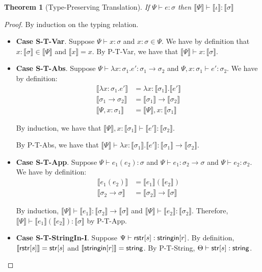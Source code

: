 \documentclass[11pt,leqno]{article}
\newtheorem{thm}{Theorem}
\theoremstyle{definition}
\newcommand{\stringin}[1]{{\sf stringin}[#1]}
\renewcommand{\tstr}[1]{{{\sf str}[#1]}}
\newcommand{\str}{{\sf string}}
\newcommand{\sctx}{\Psi} %
\newcommand{\tctx}{\Theta} %
\newcommand{\trden}[1]{\llbracket #1 \rrbracket} %
\begin{document}
\begin{thm}[Type-Preserving Translation]\label{thm:tpc}
If $\sctx \vdash e: \sigma$ then 
$\trden{\sctx} \vdash \trden{\iota} : \trden{\sigma}$
\end{thm}
\begin{proof}
By induction on the typing relation.

\begin{itemize}[label=$ $,itemsep=1ex]
\item \textbf{Case S-T-Var}. Suppose $\sctx \vdash x : \sigma$ and $x : \sigma \in \sctx$. We have by definition that $x : \trden{\sigma} \in \trden{\sctx}$ and $\trden{x} = x$. By P-T-Var, we have that $\trden{\sctx} \vdash x : \trden{\sigma}$.

\item \textbf{Case S-T-Abs}. 
Suppose $\sctx \vdash \lambda x : \sigma_1. e' : \sigma_1 \rightarrow \sigma_2$ and $\Psi, x : \sigma_1 \vdash e' : \sigma_2$. We have by definition:
\begin{align*}
\trden{\lambda x : \sigma_1.e'} &=\lambda x : \trden{\sigma_1}.\trden{e'}\\
\trden{\sigma_1 \rightarrow \sigma_2} &= \trden{\sigma_1} \rightarrow \trden{\sigma_2}\\
\trden{\Psi, x : \sigma_1} &= \trden{\Psi}, x : \trden{\sigma_1}
\end{align*}

By induction, we have that $\trden{\sctx}, x : \trden{\sigma_1} \vdash \trden{e'} : \trden{\sigma_2}$.

By P-T-Abs, we have that $\trden{\sctx} \vdash \lambda x : \trden{\sigma_1}. \trden{e'} : \trden{\sigma_1} \rightarrow \trden{\sigma_2}$.

\item \textbf{Case S-T-App}. 
Suppose $\sctx \vdash e_1(e_2) : \sigma$ and $\sctx \vdash e_1 : \sigma_2 \rightarrow \sigma$ and $\sctx \vdash e_2 : \sigma_2$. We have by definition:
\begin{align*}
\trden{e_1(e_2)} &= \trden{e_1}(\trden{e_2})\\
\trden{\sigma_2 \rightarrow \sigma} &= \trden{\sigma_2} \rightarrow \trden{\sigma}
\end{align*}

By induction, $\trden{\sctx} \vdash \trden{e_1} : \trden{\sigma_2} \rightarrow \trden{\sigma}$ and
$\trden{\sctx} \vdash \trden{e_2} : \trden{\sigma_2}$. 
Therefore, $\trden{\sctx} \vdash \trden{e_1}(\trden{e_2}) : \trden{\sigma}$ by P-T-App.

\item \textbf{Case S-T-StringIn-I}.
Suppose $\sctx \vdash \rstr{s} : \stringin{r}$.
By definition, $\trden{\rstr{s}} = \tstr{s}$ and $\trden{\stringin{r}} = \str$.
By P-T-String, $\tctx \vdash \tstr{s} : \str$.


\end{itemize}
\end{proof}
\end{document}
